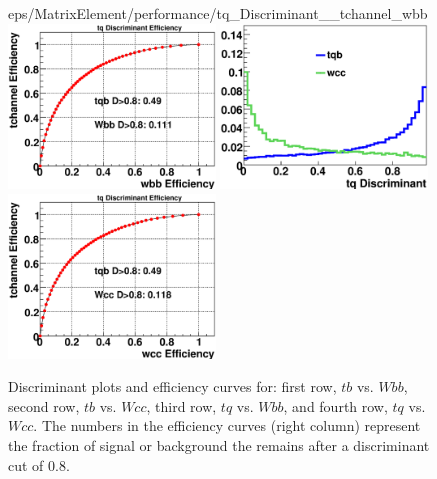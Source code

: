 \begin{figure}[!h!tbp]
{eps/MatrixElement/performance/tq_Discriminant__tchannel_wbb}
\includegraphics[width=0.49\textwidth]
{eps/MatrixElement/performance/tq_Efficiency__tchannel_wbb}
\includegraphics[width=0.49\textwidth]
{eps/MatrixElement/performance/tq_Discriminant__tchannel_wcc}
\includegraphics[width=0.49\textwidth]
{eps/MatrixElement/performance/tq_Efficiency__tchannel_wcc}
\caption{Discriminant plots and efficiency curves for:
first row, $tb$ vs. $Wbb$, second row, $tb$ vs. $Wcc$, third row, $tq$
vs. $Wbb$, and fourth row, $tq$ vs. $Wcc$. The numbers in the
efficiency curves (right column) represent the fraction of signal or
background the remains after a discriminant cut of 0.8.}
\label{disc_wbb}
\end{figure}

